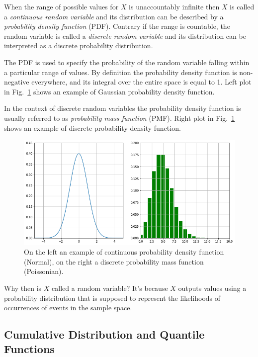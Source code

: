 When the range of possible values for $X$ is unaccountably infinite then $X$ is called a \emph{continuous random variable} and its distribution can be described by a \emph{probability density function} (PDF). Contrary if the range is countable, the random variable is called a \emph{discrete random variable} and its distribution can be interpreted as a discrete probability distribution.

The PDF is used to specify the probability of the random variable falling within a particular range of values. By definition 
the probability density function is non-negative everywhere, and its integral over the entire space is equal to 1.
Left plot in Fig.~\ref{fig:pdf_pmf} shows an example of Gaussian probability density function.

In the context of discrete random variables the probability density function is usually referred to as \emph{probability mass function} (PMF). Right plot in Fig.~\ref{fig:pdf_pmf} shows an example of discrete probability density function.

\begin{figure}[htb]
	\centering
	\includegraphics[width=1.\textwidth]{figures/pdf_pmf.png}
	\caption{On the left an example of continuous probability density function (Normal), on the right a discrete probability mass function (Poissonian).}
	\label{fig:pdf_pmf}
\end{figure}

Why then is $X$ called a random variable? It’s because $X$ outputs values using a probability distribution that is supposed to represent the likelihoods of occurrences of events in the sample space. 

\subsection{Cumulative Distribution and Quantile Functions}
\label{sec:quantile-function}

